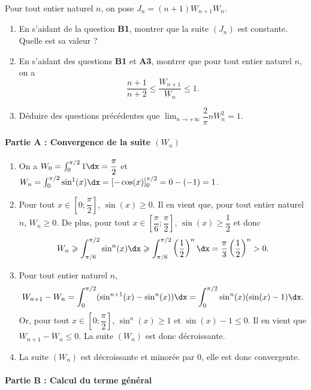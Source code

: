 \documentclass[11pt,fleqn, openany]{book} %
\begin{document}
\begin{exercise}[subtitle={(Intégrales de Wallis)}]
Pour tout entier naturel $n$, on pose $J_n=(n+1)W_{n+1}W_n$.
\begin{enumerate}
\item En s'aidant de la question \textbf{B1}, montrer que la suite $(J_n)$ est constante. Quelle est sa valeur ?
\item En s'aidant des questions \textbf{B1} et \textbf{A3}, montrer que pour tout entier naturel $n$, on a
\[\dfrac{n+1}{n+2} \leqslant \dfrac{W_{n+1}}{W_n}\leqslant 1.\]
\item Déduire des questions précédentes que $\displaystyle\lim_{n \to + \infty} \dfrac{2}{\pi}n W_n^2=1$.
\end{enumerate}


\end{exercise}

\begin{solution}


\paragraph{Partie A : Convergence de la suite $(W_n)$}

\begin{enumerate}
\item On a $W_0 = \int_0^{\pi/2} 1 \dx = \dfrac{\pi}{2}$ et $W_n = \int_0^{\pi/2} \sin^1(x) \dx=[-\cos(x)]_0^{\pi/2}=0-(-1)=1$.
\item Pour tout $x\in \left[0;\dfrac{\pi}{2}\right]$, $\sin(x)\geqslant 0$. Il en vient que, pour tout entier naturel $n$, $W_n\geqslant 0$. De plus, pour tout $x \in \left[\dfrac{\pi}{6};\dfrac{\pi}{2}\right]$, $\sin(x)\geqslant \dfrac{1}{2}$ et donc 
\[W_n \geqslant \int_{\pi/6}^{\pi/2} \sin^n(x) \dx \geqslant \int_{\pi/6}^{\pi/2} \left(\dfrac{1}{2}\right)^n \dx = \dfrac{\pi}{3}\left(\dfrac{1}{2}\right)^n >0.\]
\item Pour tout entier naturel $n$,
\[W_{n+1}-W_n=\int_0^{\pi/2} (\sin^{n+1}(x)-\sin^n(x)) \dx = \int_0^{\pi/2} \sin^n(x)(\sin(x)-1) \dx .\]
Or, pour tout $x\in  \left[0;\dfrac{\pi}{2}\right]$, $\sin^n(x)\geqslant 1$ et $\sin(x)-1 \leqslant 0$. Il en vient que $W_{n+1}-W_n \leqslant 0$. La suite $(W_n)$ est donc décroissante.
\item La suite $(W_n)$ est décroissante et minorée par 0, elle est donc convergente.
\end{enumerate}

\paragraph{Partie B : Calcul du terme général}


\end{solution}
\end{document}
